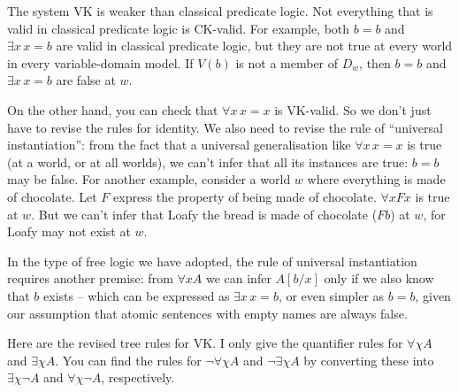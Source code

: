 The system VK is weaker than classical predicate logic. Not everything
that is valid in classical predicate logic is CK-valid. For example, both $b=b$
and $\exists x\, x\!=\!b$ are valid in classical predicate logic, but they are
not true at every world in every variable-domain model. If $V(b)$ is not a
member of $D_w$, then $b=b$ and $\exists x \, x\!=\!b$ are false at $w$.

On the other hand, you can check that $\forall x\, x\!=\!x$ is VK-valid. So we
don't just have to revise the rules for identity. We also need to revise the
rule of ``universal instantiation'': from the fact that a universal
generalisation like $\forall x\, x\!=\!x$ is true (at a world, or at all worlds),
we can't infer that all its instances are true: $b=b$ may be false. For another
example, consider a world $w$ where everything is made of chocolate. Let $F$
express the property of being made of chocolate. $\forall x Fx$ is true at $w$.
But we can't infer that Loafy the bread is made of chocolate ($Fb$) at $w$, for
Loafy may not exist at $w$.

In the type of free logic we have adopted, the rule of universal instantiation
requires another premise: from $\forall x A$ we can infer $A[b/x]$ only if we
also know that $b$ exists -- which can be expressed as $\exists x \, x\!=\!b$, or
even simpler as $b\!=\!b$, given our assumption that atomic sentences with empty
names are always false.

Here are the revised tree rules for VK. I only give the quantifier rules for
$\forall \chi A$ and $\exists \chi A$. You can find the rules for
$\neg \forall \chi A$ and $\neg\exists \chi A$ by converting these into
$\exists \chi \neg A$ and $\forall \chi \neg A$, respectively.

\bigskip

\begin{minipage}{0.6\textwidth} \centering
{}
\end{minipage}
\begin{minipage}{0.4\textwidth}\centering
{}
\end{minipage}

